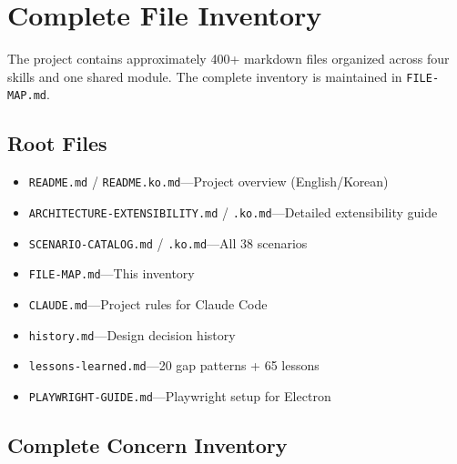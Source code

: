 \documentclass[11pt,a4paper,openright,twoside]{report}
\newcommand{\file}[1]{\texttt{#1}}
\begin{document}
\appendix

\chapter{Complete File Inventory}
\label{app:inventory}

The project contains approximately 400+ markdown files organized across four skills and one shared module. The complete inventory is maintained in \file{FILE-MAP.md}.

\section{Root Files}

\begin{itemize}
  \item \file{README.md} / \file{README.ko.md}---Project overview (English/Korean)
  \item \file{ARCHITECTURE-EXTENSIBILITY.md} / \file{.ko.md}---Detailed extensibility guide
  \item \file{SCENARIO-CATALOG.md} / \file{.ko.md}---All 38 scenarios
  \item \file{FILE-MAP.md}---This inventory
  \item \file{CLAUDE.md}---Project rules for Claude Code
  \item \file{history.md}---Design decision history
  \item \file{lessons-learned.md}---20 gap patterns + 65 lessons
  \item \file{PLAYWRIGHT-GUIDE.md}---Playwright setup for Electron
\end{itemize}

\section{Complete Concern Inventory}
\label{tab:concerns-full}
\end{document}
